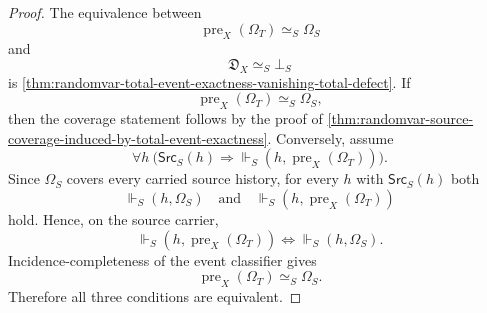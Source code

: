 \begin{proof}
The equivalence between
$$
\operatorname{pre}_X(\Omega_T)\simeq_S\Omega_S
$$
and
$$
\mathfrak D_X\simeq_S\bot_S
$$
is \autoref{thm:randomvar-total-event-exactness-vanishing-total-defect}.
If
$$
\operatorname{pre}_X(\Omega_T)\simeq_S\Omega_S,
$$
then the coverage statement follows by the proof of \autoref{thm:randomvar-source-coverage-induced-by-total-event-exactness}.
Conversely, assume
$$
\forall h\ \bigl(\mathsf{Src}_S(h)\Rightarrow \Vdash_S(h,\operatorname{pre}_X(\Omega_T))\bigr).
$$
Since $\Omega_S$ covers every carried source history, for every $h$ with $\mathsf{Src}_S(h)$ both
$$
\Vdash_S(h,\Omega_S)
\quad\text{and}\quad
\Vdash_S(h,\operatorname{pre}_X(\Omega_T))
$$
hold. Hence, on the source carrier,
$$
\Vdash_S(h,\operatorname{pre}_X(\Omega_T))
\Longleftrightarrow
\Vdash_S(h,\Omega_S).
$$
Incidence-completeness of the event classifier gives
$$
\operatorname{pre}_X(\Omega_T)\simeq_S\Omega_S.
$$
Therefore all three conditions are equivalent.
\end{proof}
